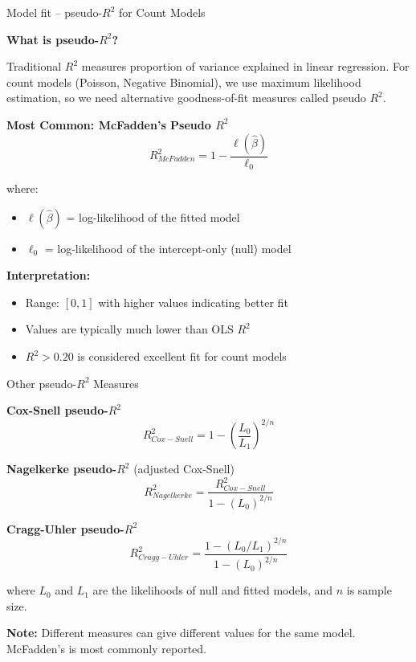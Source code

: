 \documentclass[10pt,ignorenonframetext,aspectratio=169]{beamer}
\begin{document}
\begin{frame}{Model fit -- pseudo-$R^2$ for Count Models}

\textbf{What is pseudo-$R^2$?}

Traditional $R^2$ measures proportion of variance explained in linear regression. For count models (Poisson, Negative Binomial), we use maximum likelihood estimation, so we need alternative goodness-of-fit measures called pseudo $R^2$.

\vspace{0.1cm}

\textbf{Most Common: McFadden's Pseudo $R^2$}
$$R^2_{McFadden} = 1 - \frac{\ell(\hat{\beta})}{\ell_0}$$

where:
\begin{itemize}
\item $\ell(\hat{\beta})$ = log-likelihood of the fitted model
\item $\ell_0$ = log-likelihood of the intercept-only (null) model
\end{itemize}

\vspace{0.1cm}

\textbf{Interpretation:}
\begin{itemize}
\item Range: $[0, 1]$ with higher values indicating better fit
\item Values are typically much lower than OLS $R^2$
\item $R^2 > 0.20$ is considered excellent fit for count models
\end{itemize}

\end{frame}

\begin{frame}{Other pseudo-$R^2$ Measures}

\textbf{Cox-Snell pseudo-$R^2$}
$$R^2_{Cox-Snell} = 1 - \left(\frac{L_0}{L_1}\right)^{2/n}$$

\textbf{Nagelkerke pseudo-$R^2$} (adjusted Cox-Snell)
$$R^2_{Nagelkerke} = \frac{R^2_{Cox-Snell}}{1 - (L_0)^{2/n}}$$

\textbf{Cragg-Uhler pseudo-$R^2$}
$$R^2_{Cragg-Uhler} = \frac{1 - (L_0/L_1)^{2/n}}{1 - (L_0)^{2/n}}$$

\vspace{0.5cm}

where $L_0$ and $L_1$ are the likelihoods of null and fitted models, and $n$ is sample size.

\vspace{0.5cm}

\textbf{Note:} Different measures can give different values for the same model. McFadden's is most commonly reported.

\end{frame}
\end{document}
